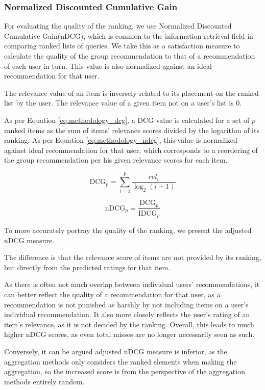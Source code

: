 \subsubsection{Normalized Discounted Cumulative Gain}\label{sec:methodology_ndcg}
For evaluating the quality of the ranking, we use Normalized Discounted Cumulative Gain(nDCG), which is common to the information retrieval field in comparing ranked lists of queries. We take this as a satisfaction measure to calculate the quality of the group recommendation to that of a recommendation of each user in turn. This value is also normalized against an ideal recommendation for that user.


The relevance value of an item is inversely related to its placement on the ranked list by the user. The relevance value of a given item not on a user's list is 0.

As per Equation \ref{eq:methodology_dcg}, a DCG value is calculated for a set of $p$ ranked items as the sum of items' relevance scores divided by the logarithm of its ranking. As per Equation \ref{eq:methodology_ndcg}, this value is normalized against ideal recommendation for that user, which corresponds to a reordering of the group recommendation per his given relevance scores for each item.

\begin{equation}\label{eq:methodology_dcg}
\text{DCG}_p = \sum_{i=1}^{p}\frac{\textit{rel}_i}{\log_2(i + 1)}
\end{equation}

\begin{equation}\label{eq:methodology_ndcg}
\text{nDCG}_p = \frac{\text{DCG}_p}{\text{IDCG}_p}
\end{equation}

To more accurately portray the quality of the ranking, we present the adjusted nDCG measure.

The difference is that the relevance score of items are not provided by its ranking, but directly from the predicted ratings for that item.

As there is often not much overlap between individual users' recommendations, it can better reflect the quality of a recommendation for that user, as a recommendation is not punished as harshly by not including items on a user's individual recommendation. It also more closely reflects the user's rating of an item's relevance, as it is not decided by the ranking. Overall, this leads to much higher nDCG scores, as even total misses are no longer necessarily seen as such.

Conversely, it can be argued adjusted nDCG measure is inferior, as the aggregation methods only considers the ranked elements when making the aggregation, so the increased score is from the perspective of the aggregation methods entirely random.